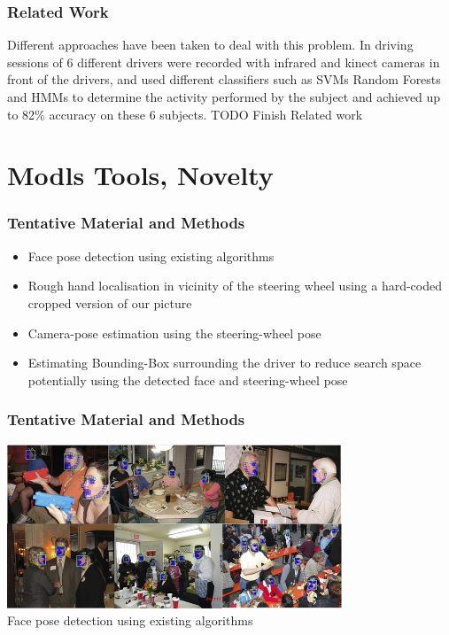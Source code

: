 \documentclass{beamer}
\begin{document}
	\begin{frame}
		\frametitle{Related Work}
		Different approaches have been taken to deal with this problem. In \cite{Ragab2014} driving sessions of 6 different drivers were recorded with infrared and kinect cameras in front of the drivers, and used different classifiers such as SVMs Random Forests and HMMs to determine the activity performed by the subject and achieved up to 82\% accuracy on these 6 subjects. 
		TODO Finish Related work
	\end{frame}
	
	\section{Modls Tools, Novelty}	
	\begin{frame}
		\frametitle{Tentative Material and Methods}
        \begin{itemize}
            \item 
                Face pose detection using existing algorithms
            \item
                Rough hand localisation in vicinity of the steering wheel using a hard-coded cropped version of our picture
            \item
                Camera-pose estimation using the steering-wheel pose
            \item
                Estimating Bounding-Box surrounding the driver to reduce search space potentially using the detected face and steering-wheel pose
        \end{itemize}
	\end{frame}	

    \begin{frame}
		\frametitle{Tentative Material and Methods}
        \begin{center}
        \includegraphics[width=10cm]{images/FacePose.jpg}\\
        Face pose detection using existing algorithms\end{center}
    \end{frame}
\end{document}
